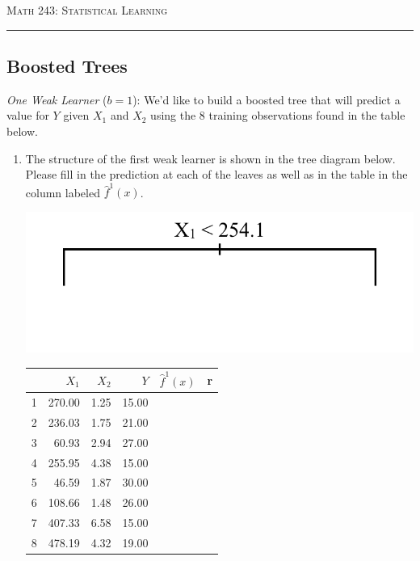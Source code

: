 \documentclass{article}\usepackage[]{graphicx}\usepackage[]{color}
\begin{document}
\begin{center}
\textsc{Math 243: Statistical Learning} \\
\noindent\rule{12cm}{0.4pt}
\end{center}

\subsection*{Boosted Trees}

\emph{One Weak Learner} ($b = 1$): We'd like to build a boosted tree that will predict a value for $Y$ given $X_1$ and $X_2$ using the 8 training observations found in the table below.

\begin{enumerate}
\item The structure of the first weak learner is shown in the tree diagram below. Please fill in the prediction at each of the leaves as well as in the table in the column labeled $\hat{f}^1(x)$.

\vspace{10mm}

\begin{minipage}[t]{.4\textwidth}
{\includegraphics[width=\textwidth]{treeA.png}}
\end{minipage}
\hfill
\begin{minipage}[t]{.4\textwidth}
\begin{tabular}{rrrrll}
  \hline
 & $X_1$ & $X_2$ & $Y$ & $\hat{f}^1(x)$ & r \\ 
  \hline
1 & 270.00 & 1.25 & 15.00 &  &  \\ 
  2 & 236.03 & 1.75 & 21.00 &  &  \\ 
  3 & 60.93 & 2.94 & 27.00 &  &  \\ 
  4 & 255.95 & 4.38 & 15.00 &  &  \\ 
  5 & 46.59 & 1.87 & 30.00 &  &  \\ 
  6 & 108.66 & 1.48 & 26.00 &  &  \\ 
  7 & 407.33 & 6.58 & 15.00 &  &  \\ 
  8 & 478.19 & 4.32 & 19.00 &  &  \\ 
   \hline
\end{tabular}


\end{minipage}
\end{enumerate}
\end{document}
